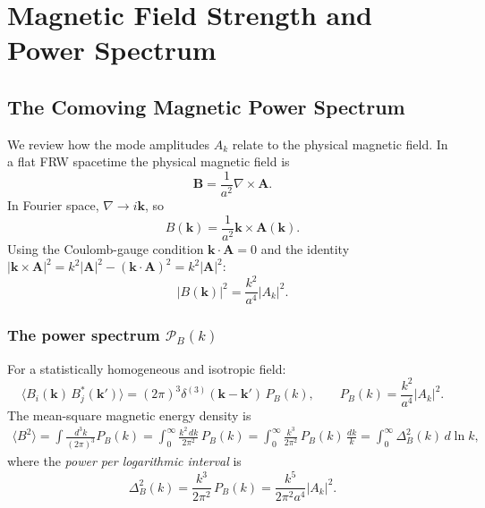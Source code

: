 \documentclass[12pt,a4paper,openany]{book}
\newcommand{\Ak}{A_k}
\begin{document}
\chapter{Magnetic Field Strength and Power Spectrum}

\section{The Comoving Magnetic Power Spectrum}

We review how the mode amplitudes $\Ak$ relate to the physical magnetic field. In a flat FRW spacetime the physical magnetic field is
\begin{equation}
  \mathbf{B} = \frac{1}{a^2}\nabla\times\mathbf{A}.
\end{equation}
In Fourier space, $\nabla \to i\mathbf{k}$, so
\begin{equation}
  B(\mathbf{k}) = \frac{1}{a^2}\mathbf{k}\times\mathbf{A}(\mathbf{k}).
\end{equation}
Using the Coulomb-gauge condition $\mathbf{k}\cdot\mathbf{A}=0$ and the identity $|\mathbf{k}\times\mathbf{A}|^2 = k^2|\mathbf{A}|^2 - (\mathbf{k}\cdot\mathbf{A})^2 = k^2|\mathbf{A}|^2$:
\begin{equation}
  |B(\mathbf{k})|^2 = \frac{k^2}{a^4}|\Ak|^2.
\end{equation}

\subsection*{The power spectrum $\mathcal{P}_B(k)$}

For a statistically homogeneous and isotropic field:
\begin{equation}
  \langle B_i(\mathbf{k})\,B_j^*(\mathbf{k}')\rangle = (2\pi)^3\delta^{(3)}(\mathbf{k}-\mathbf{k}')\,P_B(k),
  \qquad P_B(k) = \frac{k^2}{a^4}|\Ak|^2.
\end{equation}
The mean-square magnetic energy density is
\begin{align}
  \langle B^2\rangle = \int\frac{d^3k}{(2\pi)^3}P_B(k)
    = \int_0^\infty \frac{k^2\,dk}{2\pi^2}\,P_B(k)
    = \int_0^\infty \frac{k^3}{2\pi^2}\,P_B(k)\,\frac{dk}{k}
    = \int_0^\infty \Delta_B^2(k)\,d\ln k,
\end{align}
where the \emph{power per logarithmic interval} is
\begin{equation}
  \boxed{\Delta_B^2(k) = \frac{k^3}{2\pi^2}\,P_B(k) = \frac{k^5}{2\pi^2 a^4}|\Ak|^2.}
  \label{eq:powerspec}
\end{equation}
\end{document}
